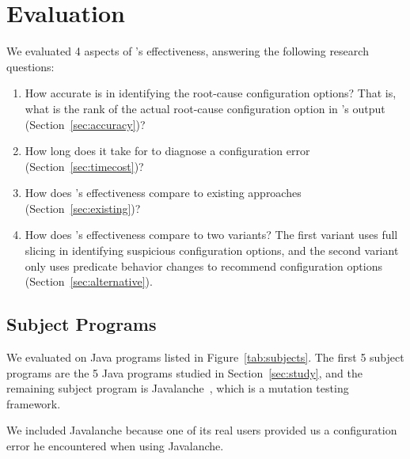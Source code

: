 
\section{Evaluation}
\label{sec:evaluation}

We evaluated 4 aspects of \ourtool's effectiveness, answering
the following research questions:

\vspace{-2mm}

\begin{enumerate}
\item How accurate is \ourtool in identifying the root-cause
configuration options? That is, what is the rank of the
actual root-cause configuration option in \ourtool's output (Section~\ref{sec:accuracy})?

\item How long does it take for \ourtool to diagnose
a configuration error (Section~\ref{sec:timecost})?

\item How does \ourtool's effectiveness compare to
existing approaches (Section~\ref{sec:existing})?

\item How does \ourtool's effectiveness compare to
two variants? The first variant
uses full slicing in identifying
suspicious configuration options, and the second 
variant only uses predicate behavior
changes to recommend configuration options (Section~\ref{sec:alternative}).

\end{enumerate}

\subsection{Subject Programs}

We evaluated \ourtool on \subjnum Java programs
listed in Figure~\ref{tab:subjects}.
The first 5 subject programs are the 5 Java programs
studied in Section~\ref{sec:study},
and the remaining subject program is Javalanche~\cite{javalanche},
which is a mutation testing framework.

We included Javalanche because one of its real users
provided us a configuration error he encountered when using Javalanche.

\newcommand{\randoopoptnum}{57\xspace}
\newcommand{\wekaoptnum}{14\xspace}
\newcommand{\synopticoptnum}{37\xspace}
\newcommand{\jchordoptnum}{79\xspace}
\newcommand{\jmeteroptnum}{55\xspace}
\newcommand{\javalancheoptnum}{35\xspace}

